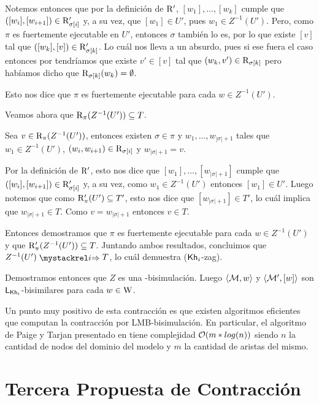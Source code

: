 \begin{demostracion}
\begin{itemize}
        Notemos entonces que por la definición de $\mathrm{R}'$, $[w_1],...,[w_k]$ cumple que $([w_i],[w_{i+1}]) \in \mathrm{R}'_{\sigma[i]}$ y, a su vez, 
        que $[w_1] \in U'$, pues $w_1 \in Z^{-1}(U')$. Pero, como $\pi$ es fuertemente ejecutable en $U'$, entonces $\sigma$ también lo es, por lo que 
        existe $[v]$ tal que $([w_k],[v]) \in \mathrm{R}'_{\sigma[k]}$. Lo cuál nos lleva a un absurdo, pues si ese fuera el caso entonces por 
         tendríamos que existe $v' \in [v]$ tal que $(w_k,v') \in \mathrm{R}_{\sigma[k]}$ pero habíamos dicho que 
        $\mathrm{R}_{\sigma[k]}(w_k) = \emptyset$.

        Esto nos dice que $\pi$ es fuertemente ejecutable para cada $w \in Z^{-1}(U')$.

        Veamos ahora que $\mathrm{R}_\pi(Z^{-1}(U')) \subseteq T$.

        Sea $v \in \mathrm{R}_\pi(Z^{-1}(U'))$, entonces existen $\sigma \in \pi$ y $w_1,...,w_{|\sigma|+1}$ tales que 
        $w_1 \in Z^{-1}(U')$, $(w_i,w_{i+1}) \in \mathrm{R}_{\sigma[i]}$ y $w_{|\sigma|+1} = v$. 

        Por la definición de $\mathrm{R}'$, esto nos dice que $[w_1],...,[w_{|\sigma|+1}]$ cumple que $([w_i],[w_{i+1}]) \in \mathrm{R}'_{\sigma[i]}$ 
        y, a su vez, como $w_1 \in Z^{-1}(U')$ entonces $[w_1] \in U'$. Luego notemos que como $\mathrm{R}'_\pi(U') \subseteq T'$, esto nos dice que 
        $[w_{|\sigma|+1}] \in T'$, lo cuál implica que $w_{|\sigma|+1} \in T$. Como $v = w_{|\sigma|+1}$ entonces $v \in T$. 

        Entonces demostramos que $\pi$ es fuertemente ejecutable para cada $w \in Z^{-1}(U')$ y que $\mathrm{R}'_\pi(Z^{-1}(U')) \subseteq T$. 
        Juntando ambos resultados, concluimos que $Z^{-1}(U') \ultsExecAgi T$, lo cuál demuestra ($\mathsf{Kh}_i$-zag).
    \end{itemize}
    Demostramos entonces que $Z$ es una \KHilogic-bisimulación. Luego $\langle \mathcal{M},w \rangle$ y $\langle \mathcal{M}',[w] \rangle$ son $\mathsf{L}_{\mathsf{Kh}_i}$-bisimilares 
    para cada $w \in \mathrm{W}$.
\end{demostracion}

Un punto muy positivo de esta contracción es que existen algoritmos eficientes que computan la contracción por LMB-bisimulación. En particular, 
el algoritmo de Paige y Tarjan presentado en \cite[`Partición Relacional más Gruesa']{Paige&TarjanContraction} tiene complejidad $\mathcal{O}(m*log(n))$ siendo $n$ la cantidad de nodos del dominio del modelo y 
$m$ la cantidad de aristas del mismo.

\section{Tercera Propuesta de Contracción}

